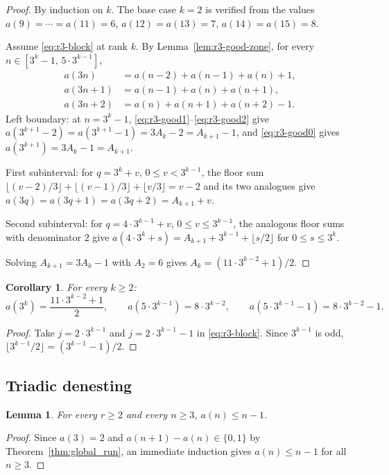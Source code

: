 \documentclass[12pt]{article}
\newtheorem{lemma}[theorem]{Lemma}
\newtheorem{corollary}[theorem]{Corollary}
\theoremstyle{definition}
\theoremstyle{remark}
\begin{document}
\begin{proof}
By induction on $k$. The base case $k=2$ is verified from
the values $a(9)=\cdots=a(11)=6$, $a(12)=a(13)=7$, $a(14)=a(15)=8$.

Assume \eqref{eq:r3-block} at rank $k$.
By Lemma~\ref{lem:r3-good-zone}, for every $n\in[3^k-1,\,5\cdot 3^{k-1}]$,
\begin{align}
  a(3n)   &= a(n-2)+a(n-1)+a(n)+1, \\
  a(3n+1) &= a(n-1)+a(n)+a(n+1),   \\
  a(3n+2) &= a(n)+a(n+1)+a(n+2)-1.
\end{align}
Left boundary: at $n=3^k-1$, \eqref{eq:r3-good1}--\eqref{eq:r3-good2} give
$a(3^{k+1}-2)=a(3^{k+1}-1)=3A_k-2=A_{k+1}-1$, and \eqref{eq:r3-good0} gives
$a(3^{k+1})=3A_k-1=A_{k+1}$.

First subinterval: for $q=3^k+v$, $0\le v<3^{k-1}$, the floor sum
$\lfloor(v-2)/3\rfloor+\lfloor(v-1)/3\rfloor+\lfloor v/3\rfloor=v-2$
and its two analogues give $a(3q)=a(3q+1)=a(3q+2)=A_{k+1}+v$.

Second subinterval: for $q=4\cdot 3^{k-1}+v$, $0\le v\le 3^{k-1}$, the analogous
floor sums with denominator $2$ give
$a(4\cdot 3^k+s)=A_{k+1}+3^{k-1}+\lfloor s/2\rfloor$ for $0\le s\le 3^k$.

Solving $A_{k+1}=3A_k-1$ with $A_2=6$ gives $A_k=(11\cdot 3^{k-2}+1)/2$.
\end{proof}

\begin{corollary}\label{cor:r3-special}
For every $k\ge 2$:
\[
  a(3^k)=\frac{11\cdot 3^{k-2}+1}{2},
  \qquad
  a(5\cdot 3^{k-1})=8\cdot 3^{k-2},
  \qquad
  a(5\cdot 3^{k-1}-1)=8\cdot 3^{k-2}-1.
\]
\end{corollary}

\begin{proof}
Take $j=2\cdot 3^{k-1}$ and $j=2\cdot 3^{k-1}-1$ in \eqref{eq:r3-block}.
Since $3^{k-1}$ is odd, $\lfloor 3^{k-1}/2\rfloor=(3^{k-1}-1)/2$.
\end{proof}

\subsection{Triadic denesting}

\begin{lemma}\label{lem:subdiag}
For every $r\ge 2$ and every $n\ge 3$, $a(n)\le n-1$.
\end{lemma}

\begin{proof}
Since $a(3)=2$ and $a(n+1)-a(n)\in\{0,1\}$ by
Theorem~\ref{thm:global_run}, an immediate induction gives
$a(n)\le n-1$ for all $n\ge 3$.
\end{proof}
\end{document}
